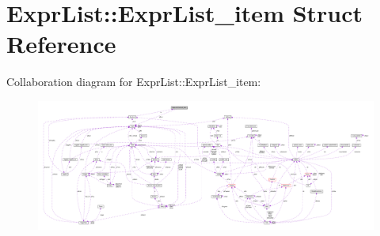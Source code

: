 \hypertarget{struct_expr_list_1_1_expr_list__item}{\section{Expr\-List\-:\-:Expr\-List\-\_\-item Struct Reference}
\label{struct_expr_list_1_1_expr_list__item}
}


Collaboration diagram for Expr\-List\-:\-:Expr\-List\-\_\-item\-:\nopagebreak
\begin{figure}[H]
\begin{center}
\leavevmode
\includegraphics[width=350pt]{struct_expr_list_1_1_expr_list__item__coll__graph}
\end{center}
\end{figure}
